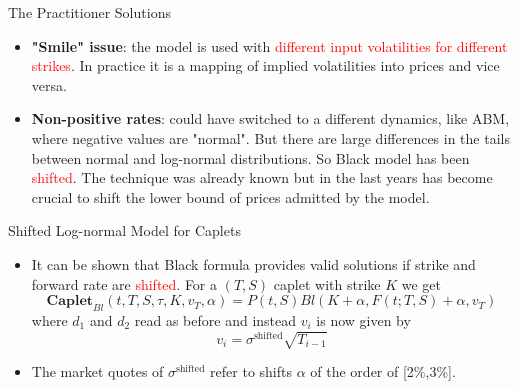 \documentclass{beamer}
\begin{document}
\begin{frame}{The Practitioner Solutions}
\begin{itemize}
	\item \textbf{"Smile" issue}: the model is used with \textcolor{red}{different input volatilities for different strikes}. In practice it is a mapping of implied volatilities into prices and vice versa.
	\item \textbf{Non-positive rates}: could have switched to a different dynamics, like ABM, where negative values are "normal". But there are large differences in the tails between normal and log-normal distributions.
	So Black model has been \textcolor{red}{shifted}. The technique was already known but in the last years has become crucial to shift the lower bound of prices admitted by the model.
\end{itemize}
\end{frame}

\begin{frame}{Shifted Log-normal Model for Caplets}
\begin{itemize}
	\item It can be shown that Black formula provides valid solutions if strike and forward rate are \textcolor{red}{shifted}. For a $(T,S)$ caplet with strike $K$ we get
	\begin{equation}
		\textbf{Caplet}_{Bl}(t,T,S,\tau,K,v_T,\alpha) = P(t,S) Bl(K+\alpha,F(t;T,S)+\alpha,v_T)
	\end{equation}
	where $d_1$ and $d_2$ read as before and instead $v_i$ is now given by
	\begin{equation*}
		v_i = \sigma^{\text{shifted}}\sqrt{T_{i-1}}
	\end{equation*}
	\item The market quotes of $\sigma^{\text{shifted}}$ refer to shifts $\alpha$ of the order of [2\%,3\%].
\end{itemize}
\end{frame}
\end{document}
